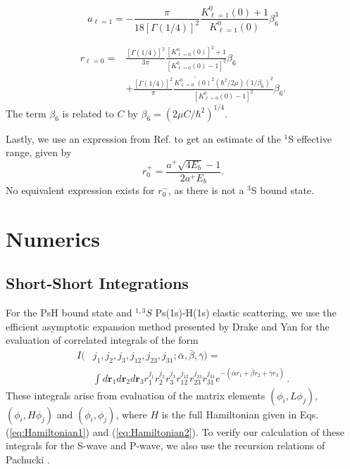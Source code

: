 \documentclass[preprint,showpacs,preprintnumbers,amsmath,amssymb,longbibliography,pra,aps]{revtex4-1}
\newcommand{\todoi}{\todo[inline]}
\begin{document}
\begin{equation}
\label{eq:GaoScatLenP}
a_{\ell=1} = -\frac{\pi}{18[\Gamma(1/4)]^2} \frac{K_{\ell=1}^0(0) + 1}{K_{\ell=1}^0(0)} \beta_6^3
\end{equation}

\begin{align}
\label{eq:GaoEffRange}
r_{\ell=0} = &\frac{[\Gamma(1/4)]^2}{3\pi} \frac{[K_{\ell=0}^0(0)]^2 + 1}{[K_{\ell=0}^0(0) - 1]^2} \beta_6 \nonumber \\
&+ \frac{[\Gamma(1/4)]^2}{\pi} \frac{{K_{\ell=0}^0}^\prime(0)^2(\hbar^2/2\mu)(1/\beta_6)^2}{[K_{\ell=0}^0(0) - 1]^2} \beta_6.
\end{align}
The term $\beta_6$ is related to $C$ by $\beta_6 = (2\mu C/\hbar^2)^{1/4}$.

Lastly, we use an expression from Ref. \cite{Blackwood2002} to get an estimate of the $^1$S effective range, given by
\begin{equation}
\label{eq:BlackwoodERT}
r_0^+ = \frac{a^+ \sqrt{4 E_b} - 1}{2 a^+ E_b}.
\end{equation}
No equivalent expression exists for $r_0^-$, as there is not a $^3$S bound state.


\section{Numerics}
\label{sec:Numerical}

\subsection{Short-Short Integrations}
\label{sec:ShortInt}
For the PsH bound state and $^{1,3}S$ Ps(1s)-H(1s) elastic scattering, we use the efficient asymptotic expansion method presented by Drake and Yan \cite{Drake1995} for the evaluation of correlated integrals of the form
\begin{align}
\label{eq:ShortInt}
I(&j_1,j_2,j_3,j_{12},j_{23},j_{31}; \bar{\alpha}, \bar{\beta}, \bar{\gamma}) =  \nonumber \\
&\int
d \textbf{r}_1 d \textbf{r}_2 d \textbf{r}_3
r_1^{j_1} r_2^{j_2} r_3^{j_3} r_{12}^{j_{12}}
r_{23}^{j_{23}} r_{31}^{j_{31}}
e^{-(\bar{\alpha} r_1 + \bar{\beta} r_2 + \bar{\gamma} r_3)}\, .
\end{align}
These integrals arise from evaluation of the matrix elements $(\phi_i, L \phi_j)$, $(\phi_i, H \phi_j)$ and $(\phi_i, \phi_j)$, where $H$ is the full Hamiltonian given in Eqs. (\ref{eq:Hamiltonian1}) and (\ref{eq:Hamiltonian2}). To verify our calculation of these integrals for the S-wave and P-wave, we also use the recursion relations of Pachucki \cite{Pachucki2004}.
\end{document}
